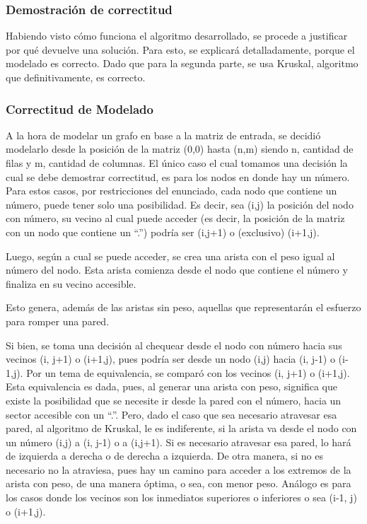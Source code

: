 	\subsubsection{Demostración de correctitud}

	Habiendo visto cómo funciona el algoritmo desarrollado, se procede a
	justificar por qué devuelve una solución. Para esto, se explicará detalladamente, porque el modelado es correcto. Dado que para la segunda parte, se usa Kruskal, algoritmo que definitivamente, es correcto.

	\subsubsection*{Correctitud de Modelado}

	A la hora de modelar un grafo en base a la matriz de entrada, se decidió modelarlo desde la posición de la matriz (0,0) hasta (n,m) siendo n, cantidad de filas y m, cantidad de columnas. El único caso el cual tomamos una decisión la cual se debe demostrar correctitud, es para los nodos en donde hay un número. Para estos casos, por restricciones del enunciado, cada nodo que contiene un número, puede tener solo una posibilidad. Es decir, sea (i,j) la posición del nodo con número, su vecino al cual puede acceder (es decir, la posición de la matriz con un nodo que contiene un “.”) podría ser (i,j+1) o (exclusivo) (i+1,j). \par

	Luego, según a cual se puede acceder, se crea una arista con el peso igual al número del nodo. Esta arista comienza desde el nodo que contiene el número y finaliza en su vecino accesible. 

	Esto genera, además de las aristas sin peso, aquellas que representarán el esfuerzo para romper una pared.\par

	Si bien, se toma una decisión al chequear desde el nodo con número hacia sus vecinos (i, j+1) o (i+1,j), pues podría ser desde un nodo (i,j) hacia (i, j-1) o (i-1,j). Por un tema de equivalencia, se comparó con los vecinos (i, j+1) o (i+1,j). Esta equivalencia es dada, pues, al generar una arista con peso, significa que existe la posibilidad que se necesite ir desde la pared con el número, hacia un sector accesible con un “.”. Pero, dado el caso que sea necesario atravesar esa pared, al algoritmo de Kruskal, le es indiferente, si la arista va desde el nodo con un número (i,j) a (i, j-1) o a (i,j+1). Si es necesario atravesar esa pared, lo hará de izquierda a derecha o de derecha a izquierda. De otra manera, si no es necesario no la atraviesa, pues hay un camino para acceder a los extremos de la arista con peso, de una manera óptima, o sea, con menor peso. Análogo es para los casos donde los vecinos son los inmediatos superiores o inferiores o sea (i-1, j) o (i+1,j).

